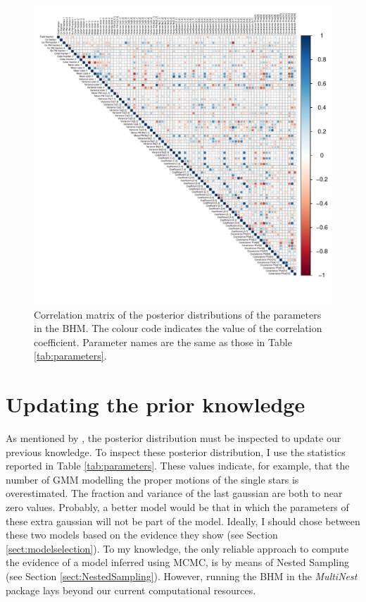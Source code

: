 \begin{figure}[ht!]
\begin{center}
\includegraphics[page=1,width=1.1\textwidth]{background/Figures/Correlations.pdf}
\caption{Correlation matrix of the posterior distributions of the parameters in the BHM. The colour code indicates the value of the correlation coefficient. Parameter names are the same as those in Table \ref{tab:parameters}.}
\label{fig:correlations}
\end{center}
\end{figure}

\section{Updating the prior knowledge}
As mentioned by \citet{Gelman2006}, the posterior distribution must be inspected to update our previous knowledge. To inspect these posterior distribution, I use the statistics reported in Table \ref{tab:parameters}. These values indicate, for example, that the number of  GMM modelling the proper motions of the single stars is overestimated. The fraction and variance of the last gaussian are both to near zero values. Probably, a better model would be that in which the parameters of these extra gaussian will not be part of the model. Ideally, I should chose between these two models based on the evidence they show (see Section \ref{sect:modelselection}). To my knowledge, the only reliable approach to compute the evidence of a model inferred using MCMC, is by means of Nested Sampling (see Section \ref{sect:NestedSampling}). However, running the BHM in the \emph{MultiNest} package lays beyond our current computational resources.

